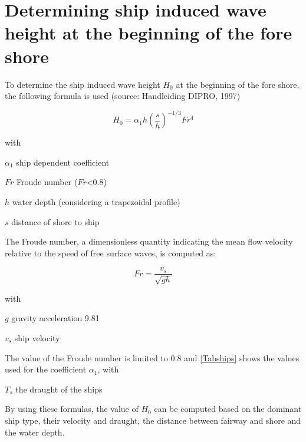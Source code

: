 \chapter{Determining ship induced wave height at the beginning of the fore shore} \label{Chp:shipwaves}

To determine the ship induced wave height $H_0$  at the beginning of the fore shore, the following formula is used (source: Handleiding DIPRO, 1997)

\begin{equation}
H_0 = \alpha_1 h \left ( \frac{s}{h} \right )^{-1/3} Fr^4
\end{equation}

with

\begin{symbollist}
\item[$\alpha_1$] ship dependent coefficient \unitbrackets{-}
\item[$Fr$] Froude number ($Fr$<0.8) \unitbrackets{-}
\item[$h$] water depth (considering a  trapezoidal profile) 
\item[$s$] distance of shore to ship 
\end{symbollist}

The Froude number, a dimensionless quantity indicating the mean flow velocity relative to the speed of free surface waves, is computed as:

\begin{equation}
Fr = \frac{v_s}{\sqrt{g h}}
\end{equation}

with

\begin{symbollist}
\item[$g$] gravity acceleration 9.81 
\item[$v_s$] ship velocity 
\end{symbollist}

The value of the Froude number is limited to 0.8 and \autoref{Tabships} shows the values used for the coefficient $\alpha_1$, with
\begin{symbollist}
\item[$T_s$]  the draught of the ships 
\end{symbollist}


By using these formulas, the value of $H_0$ can be computed based on the dominant ship type, their velocity and draught, the distance between fairway and shore and the water depth.

